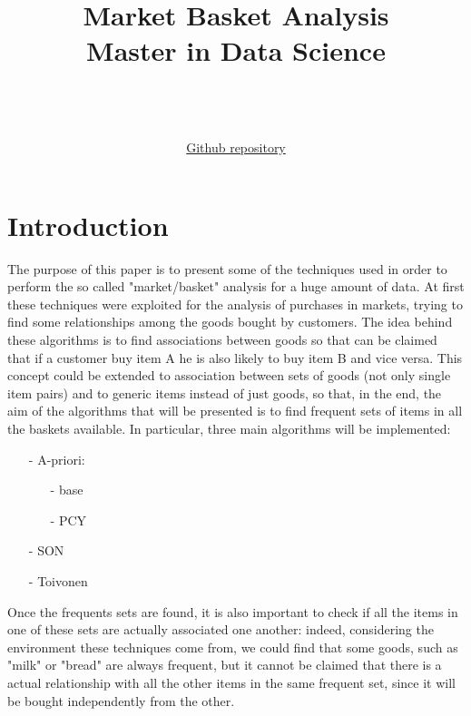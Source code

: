 \documentclass[14pt]{extarticle}
\title{{\Huge Market Basket Analysis}\\{\Large Master in Data Science}}
\author{\bigskip \\ \bigskip{\Large Alberto Bertoncini 983833}\\ \smallskip{\Large Massimo Cavagna 9838??}\\ \bigskip \href{https://github.com/Bertonc98/ProgettoAMD}{Github repository} }
\begin{document}
\maketitle
\newpage
\tableofcontents
\newpage
\section{Introduction}
The purpose of this paper is to present some of the techniques used in order to perform the so called "market/basket" analysis for a huge amount of data.
At first these techniques were exploited for the analysis of purchases in markets, trying to find some relationships among the goods bought by customers.
The idea behind these algorithms is to find associations between goods so that can be claimed that if a customer buy item A he is also likely to buy item B and vice versa.
This concept could be extended to association between sets of goods (not only single item pairs) and to generic items instead of just goods, so that,  in the end, the aim of the algorithms that will be presented is to find frequent sets of items in all the baskets available.
In particular, three main algorithms will be implemented:
\vspace{-0.2cm}\begin{itemize}[leftmargin=*]
\item[-] A-priori:
\vspace{-0.4cm}\begin{itemize}
\item[-] base
\vspace{-0.2cm}\item[-] PCY
\end{itemize}
\vspace{-0.4cm}\item[-] SON
\vspace{-0.4cm}\item[-] Toivonen
\end{itemize}
Once the frequents sets are found, it is also important to check if all the items in one of these sets are actually associated one another:
indeed, considering the environment these techniques come from, we could find that some goods, such as "milk" or "bread" are always frequent, but it cannot be claimed that there is a actual relationship with all the other items in the same frequent set, since it will be bought independently from the other.
\end{document}
